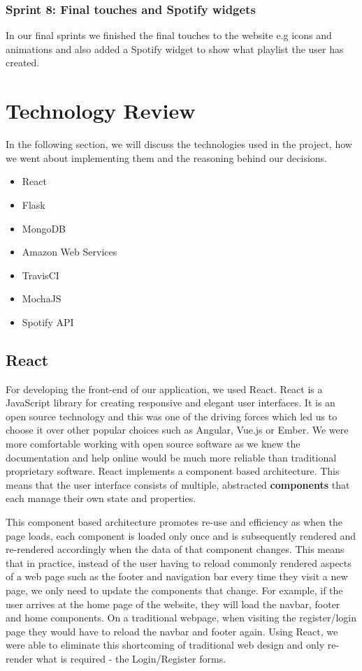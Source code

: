 \subsection{Sprint 8: Final touches and Spotify widgets}
In our final sprints we finished the final touches to the website e.g icons and animations and also added a Spotify widget to show what playlist the user has created.


\chapter{Technology Review}
In the following section, we will discuss the technologies used in the project, how we went about implementing them and the reasoning behind our decisions.

\begin{itemize}
  \item React
  \item Flask
  \item MongoDB
  \item Amazon Web Services
  \item TravisCI
  \item MochaJS
  \item Spotify API
  \end{itemize}

\section{React}
For developing the front-end of our application, we used React. React is a JavaScript library for creating responsive and elegant user interfaces. It is an open source technology and this was one of the 
driving forces which led us to choose it over other popular choices such as Angular, Vue.js or Ember. We were more comfortable working with open source software as we knew the documentation and help online would be much more reliable than traditional proprietary software.
React implements a component based architecture. This means that the user interface consists of multiple, abstracted \textbf{components} that each manage their own state and properties.
\par 
This component based architecture promotes re-use and efficiency as when the page loads, each component is loaded only once and is subsequently rendered and re-rendered accordingly when the data of that component changes. This means that in practice, instead of the user having to reload commonly rendered aspects of a web page such as
the footer and navigation bar every time they visit a new page, we only need to update the components that change. For example, if the user arrives at the home page of the website, they will load the navbar, footer and home components. On a traditional webpage, when visiting the register/login page they would have to reload the navbar and footer again. 
Using React, we were able to eliminate this shortcoming of traditional web design and only re-render what is required - the Login/Register forms.

